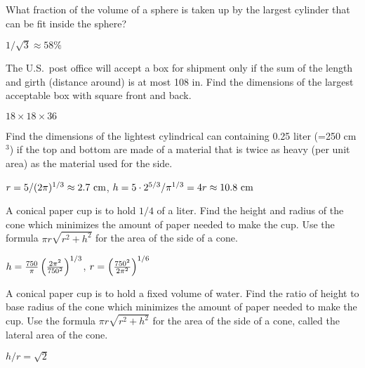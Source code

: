 \begin{exercises}
\begin{exercise}
What fraction of the volume of a sphere is taken up by the largest cylinder
that can be fit inside the sphere?
\begin{answer} $1/\sqrt3\approx 58\%$
\end{answer}\end{exercise}

\begin{exercise}
The U.S.~post office will accept a box for shipment only if the sum of the
length and girth (distance around) is at most 108 in.  Find the dimensions
of the largest acceptable box with square front and back.
\begin{answer} $18\times18\times36$
\end{answer}\end{exercise}

\begin{exercise}
Find the dimensions of the lightest cylindrical can containing 0.25 liter
(=250 cm${}^3$) if the top and bottom are made of a material that is twice
as heavy (per unit area) as the material used for the side.
\begin{answer} $r=5/(2\pi)^{1/3}\approx 2.7\hbox{ cm}$,\hfill\break
$h=5\cdot2^{5/3}/\pi^{1/3}=4r\approx 10.8 \hbox{ cm}$
\end{answer}\end{exercise}

\begin{exercise} A conical paper cup is to hold $1/4$ of a liter. Find the
height and radius of the cone which minimizes
the amount of paper needed to make the cup.  Use the formula $\pi
r\sqrt{r^2+h^2}$ for the area of the side of a cone.
\begin{answer} $h={750\over\pi}\left({2\pi^2\over 750^2}\right)^{1/3}$, 
$r=\left({750^2\over 2\pi^2}\right)^{1/6}$
\end{answer}\end{exercise}

\begin{exercise} A conical paper cup is to hold a fixed volume of water.
Find the ratio of height to base radius of the cone which minimizes
the amount of paper needed to make the cup.  Use the formula $\pi
r\sqrt{r^2+h^2}$ for the area of the side of a cone, called the
{\dfont lateral area\/} of the cone.
\begin{answer} $h/r=\sqrt2$
\end{answer}\end{exercise}


\end{exercises}
